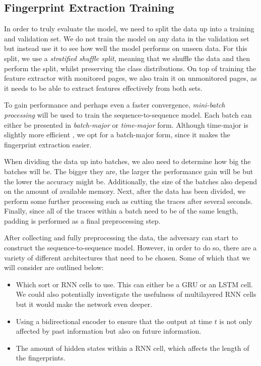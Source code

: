 \subsection{Fingerprint Extraction Training} \label{sec:fingerprint-extraction-training}

In order to truly evaluate the model, we need to split the data up into a training and validation set.
We do not train the model on any data in the validation set but instead use it to see how well the model performs on unseen data.
For this split, we use a \textit{stratified shuffle split}, meaning that we shuffle the data and then perform the split, whilst preserving the class distributions.
On top of training the feature extractor with monitored pages, we also train it on unmonitored pages, as it needs to be able to extract features effectively from both sets.

To gain performance and perhaps even a faster convergence, \textit{mini-batch processing} will be used to train the sequence-to-sequence model.
Each batch can either be presented in \textit{batch-major} or \textit{time-major} form.
Although time-major is slightly more efficient \cite{tensorflow}, we opt for a batch-major form, since it makes the fingerprint extraction easier.

When dividing the data up into batches, we also need to determine how big the batches will be.
The bigger they are, the larger the performance gain will be but the lower the accuracy might be.
Additionally, the size of the batches also depend on the amount of available memory.
Next, after the data has been divided, we perform some further processing such as cutting the traces after several seconds.
Finally, since all of the traces within a batch need to be of the same length, padding is performed as a final preprocessing step.

After collecting and fully preprocessing the data, the adversary can start to construct the sequence-to-sequence model.
However, in order to do so, there are a variety of different architectures that need to be chosen.
Some of which that we will consider are outlined below:

\begin{itemize}
  \item Which sort or RNN cells to use. This can either be a GRU or an LSTM cell.
    We could also potentially investigate the usefulness of multilayered RNN cells but it would make the network even deeper.

  \item Using a bidirectional encoder to ensure that the output at time $t$ is not only affected by past information but also on future information.

  \item The amount of hidden states within a RNN cell, which affects the length of the fingerprints.
\end{itemize}

